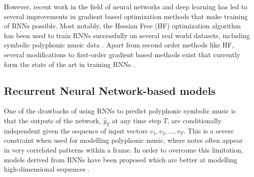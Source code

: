 	However, recent work in the field of neural networks and deep learning has led to several improvements in gradient based optimization methods that make training of RNNs possible. Most notably, the Hessian Free (HF) optimization algorithm has been used to train RNNs successfully on several real world datasets, including symbolic polyphonic music data \cite{Martens2011}. Apart from second order methods like HF, several modifications to first-order gradient based methods exist that currently form the state of the art in training RNNs \cite{bengio2012advances}. 
%


	\subsection{Recurrent Neural Network-based models}
	\label{subsec:rnn-based}
	One of the drawbacks of using RNNs to predict polyphonic symbolic music is that the outputs of the network, $\hat{y}_T$ at any time step $T$,  are conditionally independent given the sequence of input vectors $v_1, v_2, \ldots, v_T$. This is a severe constraint when used for modelling polyphonic music, where notes often appear in very correlated patterns within a frame. In order to overcome this limitation, models derived from RNNs have been proposed which are better at modelling high-dimensional sequences \cite{sutskever2008recurrent,Boulanger-Lewandowski2012}.

